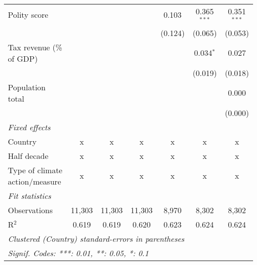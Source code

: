 \begin{tabular}{lcccccc}
   Polity score                                                         &         &               &                & 0.103          & 0.365$^{***}$  & 0.351$^{***}$\\   
                                                                        &         &               &                & (0.124)        & (0.065)        & (0.053)\\   
   Tax revenue (\% of GDP)                                              &         &               &                &                & 0.034$^{*}$    & 0.027\\   
                                                                        &         &               &                &                & (0.019)        & (0.018)\\   
   Population total                                                     &         &               &                &                &                & 0.000\\   
                                                                        &         &               &                &                &                & (0.000)\\   
   \emph{Fixed effects}\\
   Country                                                              & x       & x             & x              & x              & x              & x\\  
   Half decade                                                          & x       & x             & x              & x              & x              & x\\  
   Type of climate action/measure                                       & x       & x             & x              & x              & x              & x\\  
   \midrule \emph{Fit statistics}\\
   Observations                                                         & 11,303  & 11,303        & 11,303         & 8,970          & 8,302          & 8,302\\  
   R$^2$                                                                & 0.619   & 0.619         & 0.620          & 0.623          & 0.624          & 0.624\\  
   \midrule
   \multicolumn{7}{l}{\emph{Clustered (Country) standard-errors in parentheses}}\\
   \multicolumn{7}{l}{\emph{Signif. Codes: ***: 0.01, **: 0.05, *: 0.1}}\\
\end{tabular}
\par\endgroup


